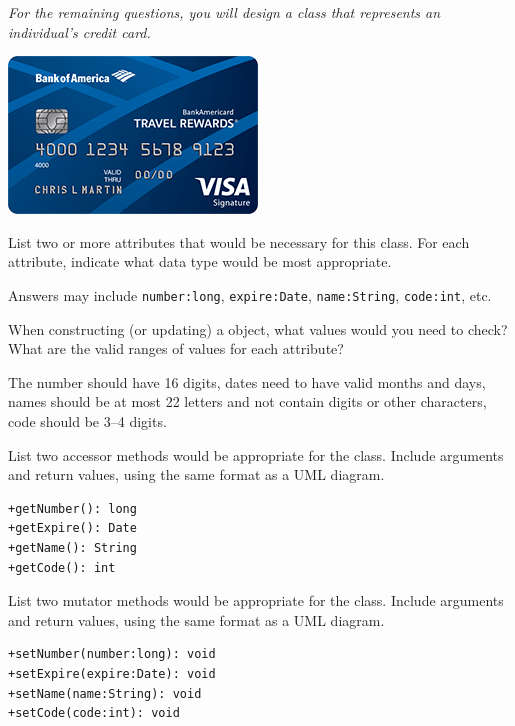 
\begin{center}
\textit{For the remaining questions, you will design a class that represents an individual's credit card.}
\bigskip\par
\includegraphics{credit-card.png}
\end{center}




\Q List two or more attributes that would be necessary for this  class. For each attribute, indicate what data type would be most appropriate.

\begin{answer}[5em]
Answers may include \verb|number:long|, \verb|expire:Date|, \verb|name:String|, \verb|code:int|, etc.
\end{answer}


\Q When constructing (or updating) a  object, what values would you need to check? What are the valid ranges of values for each attribute?

\begin{answer}[5em]
The number should have 16 digits, dates need to have valid months and days, names should be at most 22 letters and not contain digits or other characters, code should be 3--4 digits.
\end{answer}


\Q List two accessor methods would be appropriate for the  class.
Include arguments and return values, using the same format as a UML diagram.

\begin{answer}[5em]
\begin{verbatim}
+getNumber(): long
+getExpire(): Date
+getName(): String
+getCode(): int
\end{verbatim}
\end{answer}


\Q List two mutator methods would be appropriate for the  class.
Include arguments and return values, using the same format as a UML diagram.

\begin{answer}[5em]
\begin{verbatim}
+setNumber(number:long): void
+setExpire(expire:Date): void
+setName(name:String): void
+setCode(code:int): void
\end{verbatim}
\end{answer}
